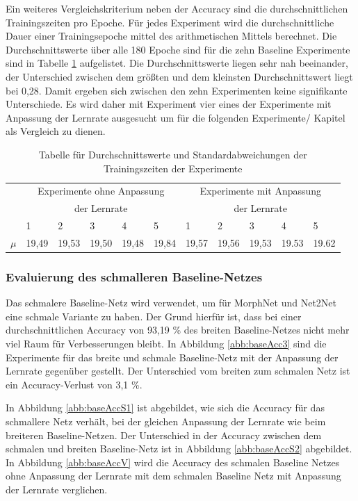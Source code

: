 Ein weiteres Vergleichskriterium neben der Accuracy sind die durchschnittlichen Trainingszeiten pro Epoche. Für jedes Experiment wird die durchschnittliche Dauer einer Trainingsepoche mittel des arithmetischen Mittels berechnet.
Die Durchschnittswerte über alle 180 Epoche sind für die zehn Baseline Experimente sind in Tabelle \ref{tab:baselineTime} aufgelistet. Die Durchschnittswerte liegen sehr nah beeinander, der Unterschied zwischen dem größten und dem kleinsten Durchschnittswert liegt bei 0,28. Damit ergeben sich zwischen den zehn Experimenten keine signifikante Unterschiede. Es wird daher mit Experiment vier eines der Experimente mit Anpassung der Lernrate ausgesucht um für die folgenden Experimente/ Kapitel als Vergleich zu dienen.
\begin{table}[h]
\begin{tabular}{|l|l|l|l|l|l|l|l|l|l|l|} \hline
           & \multicolumn{5}{c|}{Experimente ohne Anpassung}&\multicolumn{5}{c|}{Experimente mit Anpassung} \\
           &\multicolumn{5}{c|}{der Lernrate} &\multicolumn{5}{c|}{der Lernrate}\\
           & 1       & 2      & 3      & 4       & 5       & 1      & 2     & 3      & 4     & 5  \\ \hline 
$\mu$      & 19,49   & 19,53  & 19,50  & 19,48   & 19,84   & 19,57  & 19,56 & 19,53  & 19.53 & 19.62 \\ \hline
\end{tabular}
\caption{Tabelle für Durchschnittswerte und Standardabweichungen der Trainingszeiten der Experimente}
\label{tab:baselineTime}
\end{table}
\subsubsection{Evaluierung des schmalleren Baseline-Netzes}

Das schmalere Baseline-Netz wird verwendet, um für MorphNet und Net2Net eine schmale Variante zu haben. Der Grund hierfür ist, dass bei einer durchschnittlichen Accuracy von 93,19 \% des breiten Baseline-Netzes nicht mehr viel Raum für Verbesserungen bleibt. In Abbildung \ref{abb:baseAcc3} sind die Experimente für das breite und schmale Baseline-Netz mit der Anpassung der Lernrate gegenüber gestellt. Der Unterschied vom breiten zum schmalen Netz ist ein Accuracy-Verlust von 3,1 \%.    


In Abbildung \ref{abb:baseAccS1} ist abgebildet, wie sich die Accuracy für das schmallere Netz verhält, bei der gleichen Anpassung der Lernrate wie beim breiteren Baseline-Netzen. Der Unterschied in der Accuracy zwischen dem schmalen und breiten Baseline-Netz ist in Abbildung \ref{abb:baseAccS2} abgebildet. In Abbildung \ref{abb:baseAccV} wird die Accuracy des schmalen Baseline Netzes ohne Anpassung der Lernrate mit dem schmalen Baseline Netz mit Anpassung der Lernrate verglichen.


